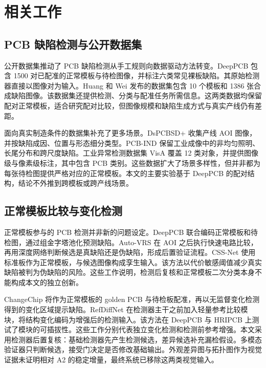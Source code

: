\section{相关工作}
\label{sec:related}

\subsection{PCB 缺陷检测与公开数据集}

公开数据集推动了 PCB 缺陷检测从手工规则向数据驱动方法转变。DeepPCB 包含 1500 对已配准的正常模板与待检图像，并标注六类常见裸板缺陷。其原始检测器直接以图像对为输入\cite{tang2019deeppcb}。Huang 和 Wei 发布的数据集包含 10 个模板和 1386 张合成缺陷图像。该数据集还提供检测、分类与配准任务所需信息\cite{huang2019hripcb}。这两类数据均保留配对正常模板，适合研究配对比较，但图像规模和缺陷生成方式与真实产线仍有差距。

面向真实制造条件的数据集补充了更多场景。DsPCBSD+ 收集产线 AOI 图像，并按缺陷成因、位置与形态细分类型\cite{lv2024dspcbsd}。PCB-IND 保留工业成像中的非均匀照明、长尾分布和跨尺度缺陷\cite{yan2026pcbind}。工业异常检测数据集 VisA 覆盖 12 类对象，并提供图像级与像素级标注，其中包含 PCB 类别\cite{zou2022visa}。这些数据扩大了场景多样性，但并非都为每张待检图提供严格对应的正常模板。本文的主要实验基于 DeepPCB 的配对结构，结论不外推到跨模板或跨产线场景。

\subsection{正常模板比较与变化检测}

正常模板参与的 PCB 检测并非新的问题设定。DeepPCB 联合编码正常模板和待检图，通过组金字塔池化预测缺陷\cite{tang2019deeppcb}。Auto-VRS 在 AOI 之后执行快速电路比较，再用深度网络判断候选是真缺陷还是伪缺陷，形成后置验证流程\cite{deng2018autovrs}。CSS-Net 使用标准板作为正常模板，与候选图像构成孪生输入。该方法以代价敏感阈值减少真实缺陷被判为伪缺陷的风险\cite{miao2021cssnet}。这些工作说明，检测后复核和正常模板二次分类本身不能构成本文的独立创新。

ChangeChip 将作为正常模板的 golden PCB 与待检板配准，再以无监督变化检测得到的变化区域提示缺陷\cite{fridman2021changechip}。RefDiffNet 在检测器主干之前加入轻量参考比较模块，将结构变化编码为增强后的检测输入。该方法在 DeepPCB 与 HRIPCB 上测试了模块的可插拔性\cite{edula2026refdiffnet}。这些工作分别代表独立变化检测和检测前参考增强。本文采用检测器后置复核：基础检测器先产生检测候选，差异候选补充漏检假设。多模态验证器只判断候选，接受门决定是否修改基础输出。外观差异图与拓扑图作为视觉证据未证明相对 A2 的稳定增量，最终系统已移除这两类视觉输入。

